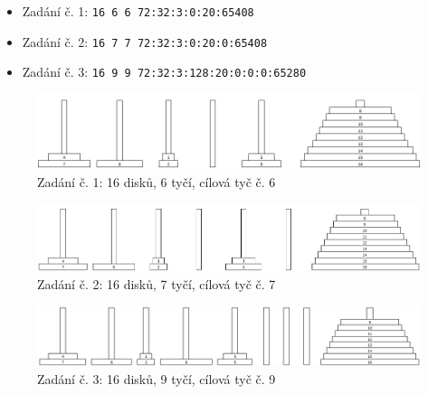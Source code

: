 \documentclass[12pt]{article}
\begin{document}
\begin{itemize}
\item Zadání č. 1: \texttt{16 6 6 72:32:3:0:20:65408}
\item Zadání č. 2: \texttt{16 7 7 72:32:3:0:20:0:65408}
\item Zadání č. 3: \texttt{16 9 9 72:32:3:128:20:0:0:0:65280}



\end{itemize}

\begin{figure}[h]
\begin{center}
\includegraphics[width=140mm]{16-6-6.png}
\caption{Zadání č. 1: 16 disků, 6 tyčí, cílová tyč č. 6}
\end{center}
\end{figure}

\begin{figure}[h]
\begin{center}
\includegraphics[width=140mm]{16-7-7.png}
\caption{Zadání č. 2: 16 disků, 7 tyčí, cílová tyč č. 7}
\end{center}
\end{figure}

\begin{figure}[h]
\begin{center}
\includegraphics[width=140mm]{16-9-9.png}
\caption{Zadání č. 3: 16 disků, 9 tyčí, cílová tyč č. 9}
\end{center}
\end{figure}
\end{document}

